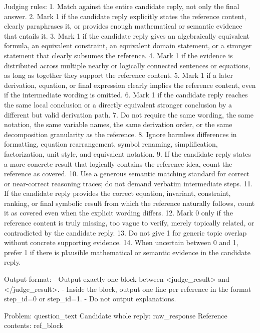 \documentclass[11pt]{article}
\begin{document}
\begin{tcolorbox}
\begin{tcblisting}
Judging rules:
1. Match against the entire candidate reply, not only the final answer.
2. Mark 1 if the candidate reply explicitly states the reference content, clearly paraphrases it, or provides enough mathematical or semantic evidence that entails it.
3. Mark 1 if the candidate reply gives an algebraically equivalent formula, an equivalent constraint, an equivalent domain statement, or a stronger statement that clearly subsumes the reference.
4. Mark 1 if the evidence is distributed across multiple nearby or logically connected sentences or equations, as long as together they support the reference content.
5. Mark 1 if a later derivation, equation, or final expression clearly implies the reference content, even if the intermediate wording is omitted.
6. Mark 1 if the candidate reply reaches the same local conclusion or a directly equivalent stronger conclusion by a different but valid derivation path.
7. Do not require the same wording, the same notation, the same variable names, the same derivation order, or the same decomposition granularity as the reference.
8. Ignore harmless differences in formatting, equation rearrangement, symbol renaming, simplification, factorization, unit style, and equivalent notation.
9. If the candidate reply states a more concrete result that logically contains the reference idea, count the reference as covered.
10. Use a generous semantic matching standard for correct or near-correct reasoning traces; do not demand verbatim intermediate steps.
11. If the candidate reply provides the correct equation, invariant, constraint, ranking, or final symbolic result from which the reference naturally follows, count it as covered even when the explicit wording differs.
12. Mark 0 only if the reference content is truly missing, too vague to verify, merely topically related, or contradicted by the candidate reply.
13. Do not give 1 for generic topic overlap without concrete supporting evidence.
14. When uncertain between 0 and 1, prefer 1 if there is plausible mathematical or semantic evidence in the candidate reply.

Output format:
- Output exactly one block between <judge_result> and </judge_result>.
- Inside the block, output one line per reference in the format step_id=0 or step_id=1.
- Do not output explanations.

Problem: {question_text}
Candidate whole reply: {raw_response}
Reference contents: {ref_block}
\end{tcblisting}

\vspace{6pt}


\end{tcolorbox}
\end{document}
